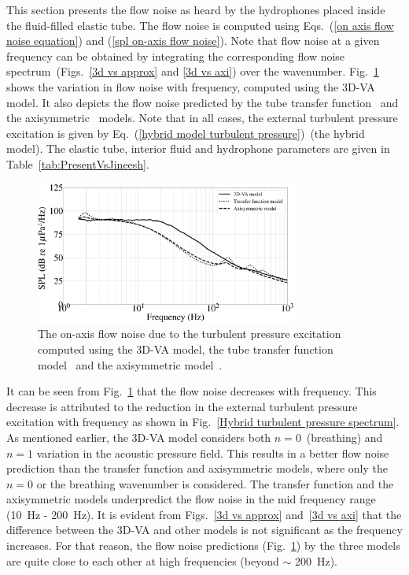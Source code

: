 \documentclass[11pt,cleanfoot]{asme2ej}
\begin{document}
This section presents the flow noise as heard by the hydrophones placed inside the fluid-filled elastic tube. The flow noise is computed using Eqs.~(\ref{on axis flow noise equation}) and (\ref{spl on-axis flow noise}). Note that flow noise at a given frequency can be obtained by integrating the corresponding flow noise spectrum~(Figs.~\ref{3d vs approx} and \ref{3d vs axi}) over the wavenumber. Fig.~\ref{3d vs knight vs jineesh} shows the variation in flow noise with frequency, computed using the 3D-VA model. It also depicts the flow noise predicted by the tube transfer function~\cite{knight1996} and the axisymmetric~\cite{jineesh2013} models. Note that in all cases, the external turbulent pressure excitation is given by Eq.~(\ref{hybrid model turbulent pressure})~(the hybrid model). The elastic tube, interior fluid and hydrophone parameters are given in Table~\ref{tab:PresentVsJineesh}.
\begin{figure}[ht]
    \centering
    \includegraphics[width=3.4in]{Flow_noise_comparison_3D_vs_Knight_Jineesh.eps}
    \caption{The on-axis flow noise due to the turbulent pressure excitation computed using the 3D-VA model, the tube transfer function model~\cite{knight1996} and the axisymmetric model~\cite{jineesh2013}.} 
    \label{3d vs knight vs jineesh}
\end{figure}
 It can be seen from Fig.~\ref{3d vs knight vs jineesh} that the flow noise decreases with frequency. This decrease is attributed to the reduction in the external turbulent pressure excitation with frequency as shown in Fig.~\ref{Hybrid turbulent pressure spectrum}. As mentioned earlier, the 3D-VA model considers both $n=0$~(breathing) and $n=1$ variation in the acoustic pressure field. This results in a better flow noise prediction than the transfer function and axisymmetric models, where only the $n=0$ or the breathing wavenumber is considered. The transfer function and the axisymmetric models underpredict the flow noise in the mid frequency range (10~Hz - 200~Hz). It is evident from Figs.~\ref{3d vs approx} and~\ref{3d vs axi} that the difference between the 3D-VA and other models is not significant as the frequency increases. For that reason, the flow noise predictions (Fig.~\ref{3d vs knight vs jineesh}) by the three models are quite close to each other at high frequencies (beyond $\sim$ 200~Hz).
\end{document}
